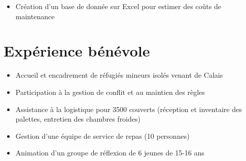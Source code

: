 \documentclass[]{cv-template}
\begin{document}
\begin{minipage}[t]{0.65\textwidth}
\begin{itemize}
\item Création d'un base de donnée sur Excel pour estimer des coûts de
  maintenance
\end{itemize}
\sectionsep

\section{Expérience bénévole}
\hfill{}
\begin{itemize}
\item Accueil et encadrement de réfugiés mineurs isolés venant de Calais
\end{itemize}

\hfill{}
\begin{itemize}
\item Participation à la gestion de conflit et au maintien des règles
\item Assistance à la logistique pour 3500 couverts (réception et inventaire
  des palettes, entretien des chambres froides)
\end{itemize}


\hfill{}
\begin{itemize}
\item Gestion d'une équipe de service de repas (10 personnes)
\item Animation d'un groupe de réflexion de 6 jeunes de 15-16 ans
\end{itemize}


\end{minipage} 
\end{document}
